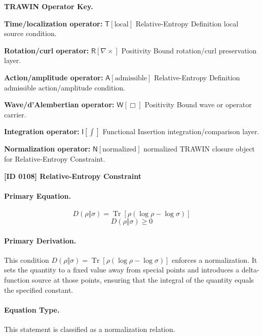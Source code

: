 \par\vspace{0.45\baselineskip}
\noindent\begin{minipage}[t]{\linewidth}
\begingroup
\small
\raggedright
\textbf{TRAWIN Operator Key.}\par
\noindent\textbf{Time/localization operator:} $\mathsf{T}\!\left[\mathrm{local}\right]$ Relative-Entropy Definition local source condition.\par
\noindent\textbf{Rotation/curl operator:} $\mathsf{R}\!\left[\nabla\times\right]$ Positivity Bound rotation/curl preservation layer.\par
\noindent\textbf{Action/amplitude operator:} $\mathsf{A}\!\left[\mathrm{admissible}\right]$ Relative-Entropy Definition admissible action/amplitude condition.\par
\noindent\textbf{Wave/d'Alembertian operator:} $\mathsf{W}\!\left[\Box\right]$ Positivity Bound wave or operator carrier.\par
\noindent\textbf{Integration operator:} $\mathsf{I}\!\left[\int\right]$ Functional Insertion integration/comparison layer.\par
\noindent\textbf{Normalization operator:} $\mathsf{N}\!\left[\mathrm{normalized}\right]$ normalized TRAWIN closure object for Relative-Entropy Constraint.\par
\endgroup
\end{minipage}

\clearpage
\noindent\textbf{[ID 0108] Relative-Entropy Constraint}\par
\vspace{0.35em}
\paragraph{Primary Equation.}
\[
D(\rho\Vert\sigma)= \operatorname{Tr}\!\left[\rho(\log\rho-\log\sigma)\right]
\]
\[
D(\rho\Vert\sigma)\ge 0
\]

\paragraph{Primary Derivation.}
This condition \( D(\rho\Vert\sigma)= \operatorname{Tr}\!\left[\rho(\log\rho-\log\sigma)\right] \) enforces a normalization. It sets the quantity to a fixed value away from special points and introduces a delta-function source at those points, ensuring that the integral of the quantity equals the specified constant.
\paragraph{Equation Type.}
This statement is classified as a normalization relation.

